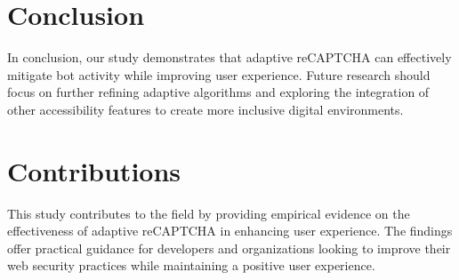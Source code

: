 \documentclass{article}
\begin{document}
\section{Conclusion}
In conclusion, our study demonstrates that adaptive reCAPTCHA can effectively mitigate bot activity while improving user experience. Future research should focus on further refining adaptive algorithms and exploring the integration of other accessibility features to create more inclusive digital environments.

\section{Contributions}
This study contributes to the field by providing empirical evidence on the effectiveness of adaptive reCAPTCHA in enhancing user experience. The findings offer practical guidance for developers and organizations looking to improve their web security practices while maintaining a positive user experience.



\end{document}
